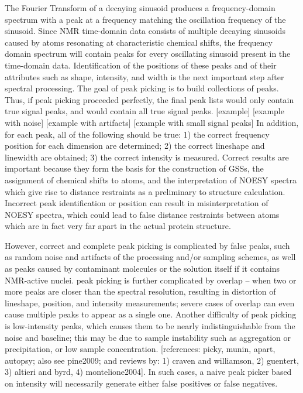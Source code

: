 The Fourier Transform of a decaying sinusoid produces a frequency-domain 
spectrum with a peak at a frequency matching the oscillation frequency of 
the sinusoid.  Since NMR time-domain data consists of multiple decaying 
sinusoids caused by atoms resonating at characteristic chemical shifts, 
the frequency domain spectrum will contain peaks for every oscillating 
sinusoid present in the time-domain data.  Identification of the positions 
of these peaks and of their attributes such as shape, intensity, and width 
is the next important step after spectral processing.  The goal of peak 
picking is to build collections of peaks.  Thus, if peak picking proceeded 
perfectly, the final peak lists would only contain true signal peaks, and 
would contain all true signal peaks.  
[example] [example with noise] [example with artifacts] [example with small signal peaks]  
In addition, for each peak, all of the following should be true: 
1) the correct frequency position for each dimension are determined; 
2) the correct lineshape and linewidth are obtained; 
3) the correct intensity is measured.  
Correct results are important because they form the basis for the construction 
of GSSs, the assignment of chemical shifts to atoms, and the interpretation of 
NOESY spectra which give rise to distance restraints as a preliminary to 
structure calculation.  Incorrect peak identification or position can result 
in misinterpretation of NOESY spectra, which could lead to false distance 
restraints between atoms which are in fact very far apart in the actual 
protein structure.
	
However, correct and complete peak picking is complicated by false peaks, 
such as random noise and artifacts of the processing and/or sampling schemes, 
as well as peaks caused by contaminant molecules or the solution itself if it 
contains NMR-active nuclei.  peak picking is further complicated by overlap -- 
when two or more peaks are closer than the spectral resolution, resulting in 
distortion of lineshape, position, and intensity measurements; severe cases 
of overlap can even cause multiple peaks to appear as a single one.  Another 
difficulty of peak picking is low-intensity peaks, which causes them to be 
nearly indistinguishable from the noise and baseline; this may be due to 
sample instability such as aggregation or precipitation, or low sample 
concentration. 
[references: picky, munin, apart, autopsy; also see pine2009; and reviews by: 
1) craven and williamson, 2) guentert, 3) altieri and byrd, 4) montelione2004].  
In such cases, a naive peak picker based on intensity will necessarily 
generate either false positives or false negatives.


